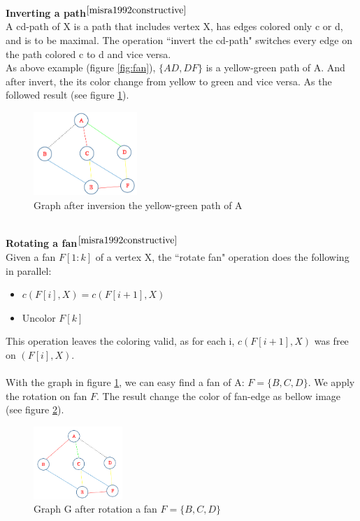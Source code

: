 \\[0.5cm]
\textbf{Inverting a path}$^{\cite{misra1992constructive}}$~\\
A cd-path of X is a path that includes vertex X, has edges colored only c or d, and is to be maximal.
The operation ``invert the cd-path" switches every edge on the path colored c to d and vice versa.\\
As above example (figure \ref{fig:fan}), $ \{AD, DF\}$ is a yellow-green path of A. And after invert, the its color change from yellow to green and vice versa. As the followed result (see figure \ref{fig:fan_invert}). \\
\begin{figure}[h!]
\centering
\includegraphics[width=0.35\textwidth]{./images/fan_invert}
\caption{Graph after inversion the yellow-green path of A}
\label{fig:fan_invert}
\end{figure}~\\
\textbf{Rotating a fan}$^{\cite{misra1992constructive}}$~\\
Given a fan $F[1:k]$ of a vertex X, the ``rotate fan" operation does the following in parallel:
\begin{itemize}
\item $c(F[i],X) = c(F[i+1],X)$
\item Uncolor $F[k]$
\end{itemize}
This operation leaves the coloring valid, as for each i, $c(F[i+1],X)$ was free on $(F[i],X)$.\\\\
With the graph in figure \ref{fig:fan_invert}, we can easy find a fan of A: $F=\{B,C,D \}$. We apply the rotation on fan $F$. The result change the color of fan-edge as bellow image (see figure \ref{fig:fan_rotation}).\\
\begin{figure}[h!]
\centering
\includegraphics[width=0.3\textwidth]{./images/fan_rotation}
\caption{Graph G after rotation a fan $F=\{B, C, D\}$}
\label{fig:fan_rotation}
\end{figure}~\\\\
